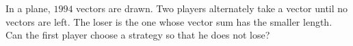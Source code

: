 In a plane, $1994$ vectors are drawn. Two players alternately take a vector until no vectors are left. The loser is the one whose vector sum has the smaller length. Can the first player choose a strategy so that he does not lose?
